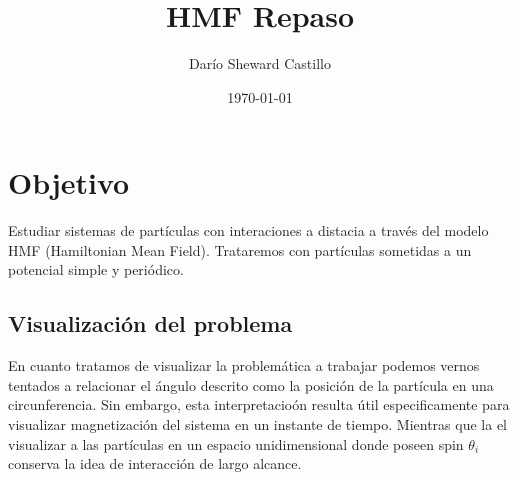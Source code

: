 \documentclass[11pt, letterpaper]{article}
\title{\textbf{HMF Repaso}}
\author{Darío Sheward Castillo}
\date{\today}
\begin{document}
\maketitle

\section*{Objetivo}
Estudiar sistemas de partículas con interaciones a distacia a través del modelo HMF (Hamiltonian Mean Field). Trataremos con partículas sometidas a un potencial simple y periódico. 

\subsection*{Visualización del problema}
En cuanto tratamos de visualizar la problemática a trabajar podemos vernos tentados a relacionar el ángulo descrito como la posición de la partícula en una circunferencia. Sin embargo, esta interpretacioón resulta útil especificamente para visualizar magnetización del sistema en un instante de tiempo. Mientras que la el visualizar a las partículas en un espacio unidimensional donde poseen spin $\theta_i$ conserva la idea de interacción de largo alcance. 
\end{document}
